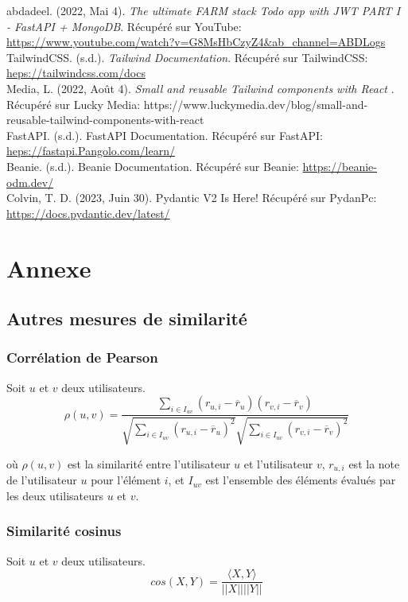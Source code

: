 \documentclass[11pt]{article}
\begin{document}
abdadeel. (2022, Mai 4). \textit{The ultimate FARM stack Todo app with JWT PART I - FastAPI + MongoDB}. 
Récupéré sur YouTube: 
\url{https://www.youtube.com/watch?v=G8MsHbCzyZ4&ab_channel=ABDLogs}\\

TailwindCSS. (s.d.). \textit{Tailwind Documentation}. Récupéré sur TailwindCSS: \url{heps://tailwindcss.com/docs}\\

Media, L. (2022, Août 4). \textit{Small and reusable Tailwind components with React} . Récupéré sur Lucky 
Media: https://www.luckymedia.dev/blog/small-and-reusable-tailwind-components-with-react\\

FastAPI. (s.d.). FastAPI Documentation. Récupéré sur FastAPI: \url{heps://fastapi.Pangolo.com/learn/}\\

Beanie. (s.d.). Beanie Documentation. Récupéré sur Beanie: \url{https://beanie-odm.dev/}\\

Colvin, T. D. (2023, Juin 30). Pydantic V2 Is Here! Récupéré sur PydanPc: 
\url{https://docs.pydantic.dev/latest/}

\section{Annexe}
\subsection{Autres mesures de similarité}
\subsubsection{Corrélation de Pearson}
Soit $u$ et $v$ deux utilisateurs. 
\begin{equation}
\rho(u, v) = \frac{\sum_{i \in I_{uv}} (r_{u,i} - \overline{r}_u)(r_{v,i} - \overline{r}_v)}{\sqrt{\sum_{i \in I_{uv}} (r_{u,i} - \overline{r}_u)^2}\sqrt{\sum_{i \in I_{uv}} (r_{v,i} - \overline{r}_v)^2}}
\end{equation}

où $\rho(u, v)$ est la similarité entre l'utilisateur $u$ et l'utilisateur $v$, $r_{u,i}$ est la note de l'utilisateur $u$ pour l'élément $i$, et $I_{uv}$ est l'ensemble des éléments évalués par les deux utilisateurs $u$ et $v$.

\subsubsection{Similarité cosinus}
Soit $u$ et $v$ deux utilisateurs. 
\begin{equation}
cos(X, Y) = \frac{\langle X, Y \rangle}{||X|| ||Y||}
\end{equation}
\end{document}
